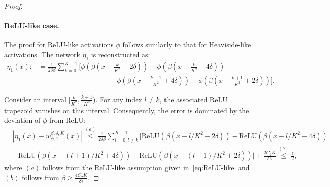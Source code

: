 \documentclass[11pt]{article}
\begin{document}
\begin{proof}
    \noindent
    \paragraph{ReLU-like case.} The proof for ReLU-like activations $\phi$ follows similarly to that for Heaviside-like activations. The network $\eta_1$ is reconstructed as:
    \begin{equation*}
        \begin{aligned}
            \eta_1(x): &= \frac{1}{2 \delta \beta}\sum_{k=0}^{K-1} \Bigg[ \phi \left( \beta \left( x - \frac{k}{K^2} - 2\delta\right)\right) - \phi \left( \beta \left( x - \frac{k}{K^2} - 4\delta\right)\right) \\
            & \qquad \qquad \qquad \qquad \qquad - \phi \left( \beta \left( x - \frac{k+1}{K^2} +4\delta\right)\right) + \phi \left( \beta \left( x - \frac{k+1}{K^2} +2\delta\right)\right)
            \Bigg].
        \end{aligned}
    \end{equation*}


    Consider an interval $[\frac{k}{K^2}, \frac{k+1}{K^2})$. For any index $l \neq k$, the associated ReLU trapezoid vanishes on this interval. Consequently, the error is dominated by the deviation of $\phi$ from $\mathrm{ReLU}$:
    \begin{equation}
        \begin{aligned}
            &|\eta_1 (x) - w_{\phi,1}^{\beta, \delta, K}(x)|  \overset{(a)}{\leq} \frac{1}{2\delta \beta} \sum_{l =0, l \neq k}^{K-1} \Big| \mathrm{ReLU}(\beta (x - l/K^2-2 \delta)) -  \mathrm{ReLU}(\beta (x - l/K^2-4 \delta)) \\
           &   -  \mathrm{ReLU}(\beta (x - (l+1)/K^2+4 \delta))  +   \mathrm{ReLU}(\beta (x - (l+1)/K^2+2 \delta))\Big| + 
           \frac{2C_2 K}{\delta \beta} \overset{(b)}{\leq} \frac{\epsilon}{2},
        \end{aligned}
        \label{eq:two-layer-app-ReLU}
    \end{equation}
    where $(a)$ follows from the ReLU-like assumption given in~\eqref{eq:ReLU-like} and $(b)$ follows from $\beta \geq \frac{4C_2 K}{\delta \epsilon} $. 



\end{proof}
\end{document}
